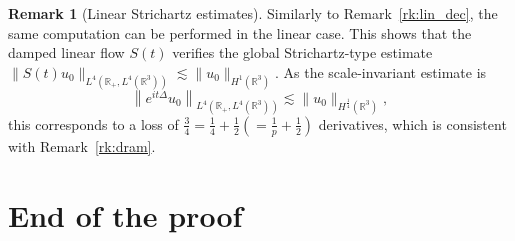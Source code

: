 \documentclass[10pt]{amsart}
\theoremstyle{definition}\newtheorem{defi}[theo]{Definition}\newtheorem{rema}[theo]{Remark}\newtheorem{exam}[theo]{Example}\newtheorem{exem}[theo]{Example}\newtheorem{nota}[theo]{Notation}
\newcommand*\R{\mathbb{R}}
\begin{document}
\begin{rema}[Linear Strichartz estimates]
Similarly to Remark~\ref{rk:lin_dec}, the same computation can be performed in the linear case. This shows that the damped linear flow $S(t)$ verifies the global Strichartz-type estimate $\| S(t) u_0 \|_{L^4(\R_+, L^4(\R^3))} \lesssim \| u_0 \|_{H^1(\R ^3)}$. As the scale-invariant estimate is
\[
\left\| e^{it\Delta} u_0\right\|_{L^4(\R_+, L^4(\R^3))} \lesssim \| u_0 \|_{H^{\frac 14}(\R^3)},
\]
this corresponds to a loss of $\frac 34 = \frac 14 + \frac 12 (= \frac 1p + \frac 12)$ derivatives, which is consistent with Remark~\ref{rk:dram}.
\end{rema}



\section{End of the proof}\label{secEnd}
\end{document}
